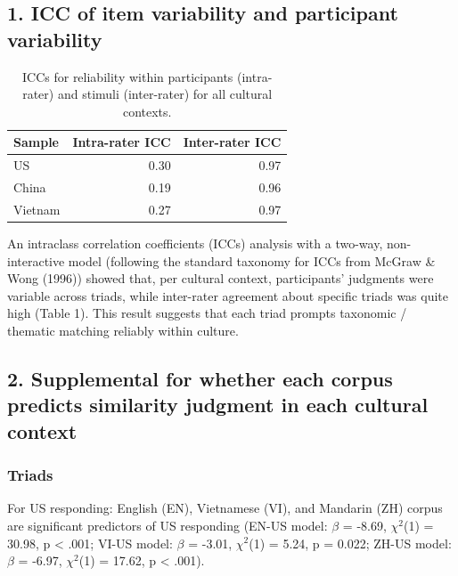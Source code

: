 \documentclass[10pt, letterpaper]{article}
\begin{document}
\hypertarget{icc-of-item-variability-and-participant-variability}{%
\subsection{1. ICC of item variability and participant
variability}\label{icc-of-item-variability-and-participant-variability}}

\begin{table}[ht]
\centering
\begin{tabular}{lrr}
  \hline
Sample & Intra-rater ICC & Inter-rater ICC \\ 
  \hline
US & 0.30 & 0.97 \\ 
  China & 0.19 & 0.96 \\ 
  Vietnam & 0.27 & 0.97 \\ 
   \hline
\end{tabular}
\caption{ICCs for reliability within participants (intra-rater) and stimuli (inter-rater) for all cultural contexts.} 
\end{table}

An intraclass correlation coefficients (ICCs) analysis with a two-way,
non-interactive model (following the standard taxonomy for ICCs from
McGraw \& Wong (1996)) showed that, per cultural context, participants'
judgments were variable across triads, while inter-rater agreement about
specific triads was quite high (Table 1). This result suggests that each
triad prompts taxonomic / thematic matching reliably within culture.

\hypertarget{supplemental-for-whether-each-corpus-predicts-similarity-judgment-in-each-cultural-context}{%
\subsection{2. Supplemental for whether each corpus predicts similarity
judgment in each cultural
context}\label{supplemental-for-whether-each-corpus-predicts-similarity-judgment-in-each-cultural-context}}

\hypertarget{triads}{%
\subsubsection{Triads}\label{triads}}

For US responding: English (EN), Vietnamese (VI), and Mandarin (ZH)
corpus are significant predictors of US responding (EN-US model:
\(\beta\) = -8.69, \(\chi^2\)(1) = 30.98, p \textless{} .001; VI-US
model: \(\beta\) = -3.01, \(\chi^2\)(1) = 5.24, p = 0.022; ZH-US model:
\(\beta\) = -6.97, \(\chi^2\)(1) = 17.62, p \textless{} .001).
\end{document}
